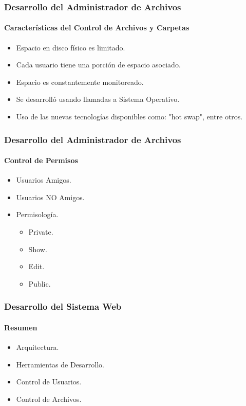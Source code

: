 \documentclass[spanish,xcolor=dvipsnames]{beamer}
\begin{document}
    \begin{frame}
    	\frametitle{Desarrollo del Administrador de Archivos}
    	\framesubtitle{Características del Control de Archivos y Carpetas}
    	
    	\begin{itemize}
    		\item Espacio en disco físico es limitado.
    		\item Cada usuario tiene una porción de espacio asociado.
    		\item Espacio es constantemente monitoreado.
    		\item Se desarrolló usando llamadas a Sistema Operativo.
    		\item Uso de las nuevas tecnologías disponibles como: "hot swap", entre otros.
    	\end{itemize}
    \end{frame}
    \begin{frame}
    	\frametitle{Desarrollo del Administrador de Archivos}
    	\framesubtitle{Control de Permisos}
    	
    	\begin{itemize}
    		\item Usuarios Amigos.
    		\item Usuarios NO Amigos.
    		\item Permisología.
    		\begin{itemize}
    			\item Private.
    			\item Show.
    			\item Edit.
    			\item Public.
    		\end{itemize}
    	\end{itemize}
    \end{frame}
    \begin{frame}
    	\frametitle{Desarrollo del Sistema Web}
    	\framesubtitle{Resumen}
    	
    	\begin{itemize}
    		\item Arquitectura.
    		\item Herramientas de Desarrollo.
    		\item Control de Usuarios.
    		\item Control de Archivos.
    	\end{itemize}
    	
    \end{frame}
    
\end{document}
